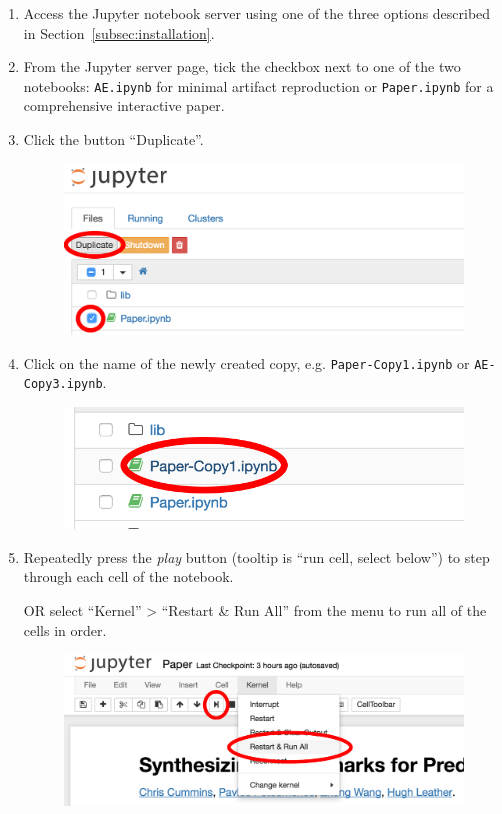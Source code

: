 \begin{enumerate}
  \item Access the Jupyter notebook server using one of the three options described in Section~\ref{subsec:installation}.
  \item From the Jupyter server page, tick the checkbox next to one of the two notebooks: \texttt{AE.ipynb} for minimal artifact reproduction or \texttt{Paper.ipynb} for a comprehensive interactive paper.
  \item Click the button ``Duplicate''.
  \begin{figure}[H]
    \includegraphics[width=\columnwidth]{img/notebook}
  \end{figure}
  \item Click on the name of the newly created copy, e.g. \texttt{Paper-Copy1.ipynb} or \texttt{AE-Copy3.ipynb}.
  \begin{figure}[H]
    \includegraphics[width=\columnwidth]{img/notebook-copy}
  \end{figure}
  \item Repeatedly press the \emph{play} button (tooltip is ``run cell, select below'') to step through each cell of the notebook.
  
  OR select ``Kernel'' > ``Restart \& Run All'' from the menu to run all of the cells in order.
  \begin{figure}[H]
    \includegraphics[width=\columnwidth]{img/jupyter}
  \end{figure}
\end{enumerate}


